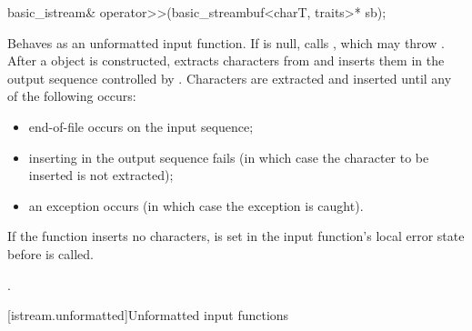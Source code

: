 %
\begin{itemdecl}
basic_istream& operator>>(basic_streambuf<charT, traits>* sb);
\end{itemdecl}

\begin{itemdescr}
\pnum
\effects
Behaves as an unformatted input function.
If  is null, calls
,
which may throw
.
After a  object is constructed, extracts
characters from
and inserts them in the output sequence controlled by .
Characters are extracted and inserted until any of the following occurs:
\begin{itemize}
\item
end-of-file occurs on the input sequence;
\item
inserting in the output sequence fails
(in which case the character to be inserted is not extracted);
\item
an exception occurs (in which case the exception is caught).
\end{itemize}

\pnum
If the function inserts no characters,
 is set in the input function's local error state
before  is called.

\pnum
\returns
{}.
\end{itemdescr}

[istream.unformatted]{Unformatted input functions}

